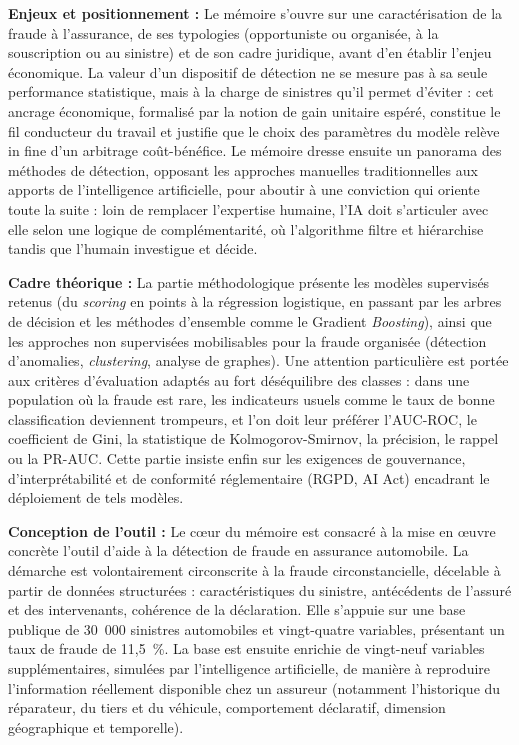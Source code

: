 \noindent\textbf{Enjeux et positionnement :} Le mémoire s'ouvre sur une caractérisation de la fraude à l'assurance, de ses typologies (opportuniste ou organisée, à la souscription ou au sinistre) et de son cadre juridique, avant d'en établir l'enjeu économique. La valeur d'un dispositif de détection ne se mesure pas à sa seule performance statistique, mais à la charge de sinistres qu'il permet d'éviter : cet ancrage économique, formalisé par la notion de gain unitaire espéré, constitue le fil conducteur du travail et justifie que le choix des paramètres du modèle relève in fine d'un arbitrage coût-bénéfice. Le mémoire dresse ensuite un panorama des méthodes de détection, opposant les approches manuelles traditionnelles aux apports de l'intelligence artificielle, pour aboutir à une conviction qui oriente toute la suite : loin de remplacer l'expertise humaine, l'IA doit s'articuler avec elle selon une logique de complémentarité, où l'algorithme filtre et hiérarchise tandis que l'humain investigue et décide.

\bigskip

\noindent\textbf{Cadre théorique :} La partie méthodologique présente les modèles supervisés retenus (du \textit{scoring} en points à la régression logistique, en passant par les arbres de décision et les méthodes d'ensemble comme le Gradient \textit{Boosting}), ainsi que les approches non supervisées mobilisables pour la fraude organisée (détection d'anomalies, \textit{clustering}, analyse de graphes). Une attention particulière est portée aux critères d'évaluation adaptés au fort déséquilibre des classes : dans une population où la fraude est rare, les indicateurs usuels comme le taux de bonne classification deviennent trompeurs, et l'on doit leur préférer l'AUC-ROC, le coefficient de Gini, la statistique de Kolmogorov-Smirnov, la précision, le rappel ou la PR-AUC. Cette partie insiste enfin sur les exigences de gouvernance, d'interprétabilité et de conformité réglementaire (RGPD, AI Act) encadrant le déploiement de tels modèles.

\bigskip

\noindent\textbf{Conception de l'outil :} Le cœur du mémoire est consacré à la mise en œuvre concrète l'outil d'aide à la détection de fraude en assurance automobile. La démarche est volontairement circonscrite à la fraude circonstancielle, décelable à partir de données structurées : caractéristiques du sinistre, antécédents de l'assuré et des intervenants, cohérence de la déclaration. Elle s'appuie sur une base publique de 30~000 sinistres automobiles et vingt-quatre variables, présentant un taux de fraude de 11,5~\%. La base est ensuite enrichie de vingt-neuf variables supplémentaires, simulées par l'intelligence artificielle, de manière à reproduire l'information réellement disponible chez un assureur (notamment l'historique du réparateur, du tiers et du véhicule, comportement déclaratif, dimension géographique et temporelle). 

